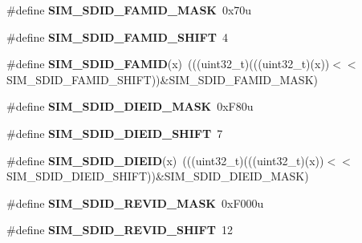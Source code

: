 \begin{DoxyCompactItemize}
\item 
\#define {\bfseries S\+I\+M\+\_\+\+S\+D\+I\+D\+\_\+\+F\+A\+M\+I\+D\+\_\+\+M\+A\+SK}~0x70u\hypertarget{group__SIM__Register__Masks_ga5344e7283b2aead14d9d3bded0114f3b}{}\label{group__SIM__Register__Masks_ga5344e7283b2aead14d9d3bded0114f3b}

\item 
\#define {\bfseries S\+I\+M\+\_\+\+S\+D\+I\+D\+\_\+\+F\+A\+M\+I\+D\+\_\+\+S\+H\+I\+FT}~4\hypertarget{group__SIM__Register__Masks_ga377bc761e6ee1caab79baad3e2d0d331}{}\label{group__SIM__Register__Masks_ga377bc761e6ee1caab79baad3e2d0d331}

\item 
\#define {\bfseries S\+I\+M\+\_\+\+S\+D\+I\+D\+\_\+\+F\+A\+M\+ID}(x)~(((uint32\+\_\+t)(((uint32\+\_\+t)(x))$<$$<$S\+I\+M\+\_\+\+S\+D\+I\+D\+\_\+\+F\+A\+M\+I\+D\+\_\+\+S\+H\+I\+FT))\&S\+I\+M\+\_\+\+S\+D\+I\+D\+\_\+\+F\+A\+M\+I\+D\+\_\+\+M\+A\+SK)\hypertarget{group__SIM__Register__Masks_gad745ac0cdf951b6e7a8fd2f3e133d961}{}\label{group__SIM__Register__Masks_gad745ac0cdf951b6e7a8fd2f3e133d961}

\item 
\#define {\bfseries S\+I\+M\+\_\+\+S\+D\+I\+D\+\_\+\+D\+I\+E\+I\+D\+\_\+\+M\+A\+SK}~0x\+F80u\hypertarget{group__SIM__Register__Masks_ga8b02a91f9dd18064e4fc83575cfb117e}{}\label{group__SIM__Register__Masks_ga8b02a91f9dd18064e4fc83575cfb117e}

\item 
\#define {\bfseries S\+I\+M\+\_\+\+S\+D\+I\+D\+\_\+\+D\+I\+E\+I\+D\+\_\+\+S\+H\+I\+FT}~7\hypertarget{group__SIM__Register__Masks_gaedeb2d58c67fcc1e588f224527ac623b}{}\label{group__SIM__Register__Masks_gaedeb2d58c67fcc1e588f224527ac623b}

\item 
\#define {\bfseries S\+I\+M\+\_\+\+S\+D\+I\+D\+\_\+\+D\+I\+E\+ID}(x)~(((uint32\+\_\+t)(((uint32\+\_\+t)(x))$<$$<$S\+I\+M\+\_\+\+S\+D\+I\+D\+\_\+\+D\+I\+E\+I\+D\+\_\+\+S\+H\+I\+FT))\&S\+I\+M\+\_\+\+S\+D\+I\+D\+\_\+\+D\+I\+E\+I\+D\+\_\+\+M\+A\+SK)\hypertarget{group__SIM__Register__Masks_gaea847889b6fc3ce04fbbe415d64ef070}{}\label{group__SIM__Register__Masks_gaea847889b6fc3ce04fbbe415d64ef070}

\item 
\#define {\bfseries S\+I\+M\+\_\+\+S\+D\+I\+D\+\_\+\+R\+E\+V\+I\+D\+\_\+\+M\+A\+SK}~0x\+F000u\hypertarget{group__SIM__Register__Masks_gafefd91d0385c1b93049ec14409ed6b1e}{}\label{group__SIM__Register__Masks_gafefd91d0385c1b93049ec14409ed6b1e}

\item 
\#define {\bfseries S\+I\+M\+\_\+\+S\+D\+I\+D\+\_\+\+R\+E\+V\+I\+D\+\_\+\+S\+H\+I\+FT}~12\hypertarget{group__SIM__Register__Masks_gadb535428e0ca83d2494493ed04822b8c}{}\label{group__SIM__Register__Masks_gadb535428e0ca83d2494493ed04822b8c}


\end{DoxyCompactItemize}
